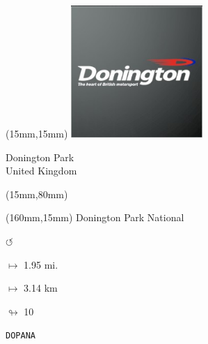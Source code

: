 \begin{textblock*}{50mm}(15mm,15mm)%
\includegraphics[width=50mm]{LG/2015-05-20_00080.png}
\par Donington Park\\ United Kingdom
\end{textblock*}
\begin{textblock*}{185mm}(15mm,80mm)%
\end{textblock*}
\begin{textblock*}{40mm}(160mm,15mm)%
Donington Park National
\par \Huge$\circlearrowleft$
\Large
\par$\mapsto$ 1.95 mi.
\par$\mapsto$ 3.14 km
\par$\looparrowright$ 10
\par\hfill\tiny\tt DOPANA\\
\end{textblock*}
\null\newpage

